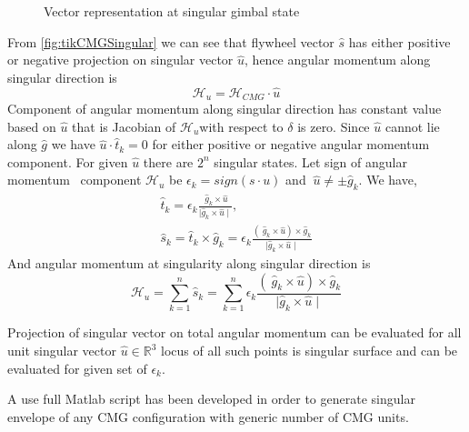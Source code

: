\begin{figure}[!h]
    \centering
    
    \caption{Vector representation at singular gimbal state}
    \label{fig:tikCMGSingular}
\end{figure}

From \autoref{fig:tikCMGSingular} we can see that flywheel vector $\displaystyle \hat{s}$ has either positive or negative projection on singular vector $\displaystyle \hat{u}$, hence angular momentum along singular direction is
\begin{equation*}
\mathcal{H}_{u} =\mathcal{H}_{CMG} \cdotp \hat{u}
\end{equation*}
Component of angular momentum along singular direction has constant value based on $\displaystyle \hat{u}$ that is Jacobian of $\displaystyle \mathcal{H}_{u}$with respect to $\displaystyle \delta $ is zero. Since $\displaystyle \hat{u}$ cannot lie along $\displaystyle \hat{g}$ we have $\displaystyle \hat{u} \cdotp \hat{t}_{k} =0$ for either positive or negative angular momentum component. For given $\displaystyle \hat{u}$ there are $\displaystyle 2^{n}$ singular states. Let sign of angular momentum \ component $\displaystyle \mathcal{H}_{u}$ be $\displaystyle \epsilon _{k} =sign( s\cdotp u)$ and $\displaystyle \ \hat{u} \neq \pm \hat{g}_{k}$. We have,
\begin{gather}
\hat{t}_{k} =\epsilon _{k}\frac{\ \hat{g}_{k} \times \hat{u}}{\mid \hat{g}_{k} \times \hat{u} \mid } ,\\
\hat{s}_{k} =\hat{t}_{k} \times \hat{g}_{k} =\epsilon _{k}\frac{( \ \hat{g}_{k} \times \hat{u}) \times \hat{g}_{k}}{\mid \hat{g}_{k} \times \hat{u} \mid }
\end{gather}
And angular momentum at singularity along singular direction is 
\begin{equation}
\mathcal{H}_{u} =\sum ^{n}_{k=1}\hat{s}_{k} =\sum ^{n}_{k=1} \epsilon _{k}\frac{( \ \hat{g}_{k} \times \hat{u}) \times \hat{g}_{k}}{\mid \hat{g}_{k} \times \hat{u} \mid }
\end{equation}


Projection of singular vector on total angular momentum can be evaluated for all unit singular vector $\displaystyle \hat{u} \in \mathbb{R}^{3}$ locus of all such points is singular surface and can be evaluated for given set of $\epsilon_k$. \cite{YoonSingularity}

A use full Matlab script has been developed in order to generate singular envelope of any CMG configuration with generic number of CMG units.

